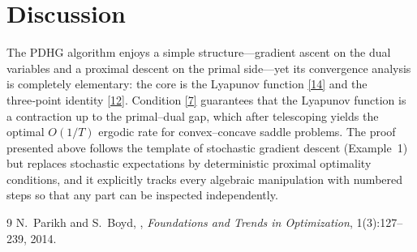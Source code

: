 \documentclass{article}
\begin{document}
\section*{Discussion}
The PDHG algorithm enjoys a simple structure—gradient ascent on the dual
variables and a proximal descent on the primal side—yet its convergence
analysis is completely elementary: the core is the Lyapunov function
\eqref{14} and the three‑point identity \eqref{12}.  Condition \eqref{7}
guarantees that the Lyapunov function is a contraction up to the primal–dual
gap, which after telescoping yields the optimal $O(1/T)$ ergodic rate for
convex–concave saddle problems.  The proof presented above follows the
template of stochastic gradient descent (Example 1) but replaces stochastic
expectations by deterministic proximal optimality conditions, and it
explicitly tracks every algebraic manipulation with numbered steps so that
any part can be inspected independently.


\begin{thebibliography}{9}
N.~Parikh and S.~Boyd,
,
\newblock \emph{Foundations and Trends in Optimization}, 1(3):127–239, 2014.
\end{thebibliography}
\end{document}
